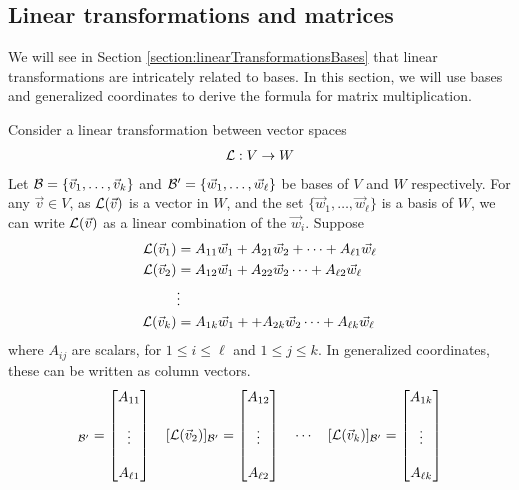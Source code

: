 \subsection{Linear transformations and matrices}
We will see in Section \ref{section:linearTransformationsBases} that linear transformations are intricately related to bases.
In this section, we will use bases and generalized coordinates to derive the formula for matrix multiplication.

Consider a linear transformation between vector spaces
\begin{align*}
  \mathcal{L}: V \rightarrow W
\end{align*}
Let $\mathcal{B} = \{ \vec{v}_1 , \dots, \vec{v}_k \}$ and $\mathcal{B}'= \{ \vec{w}_1 , \dots, \vec{w}_\ell \}$ be bases of $V$ and $W$ respectively.
For any $\vec{v} \in V$, as $\mathcal{L}(\vec{v})$ is a vector in $W$, and the set $\{ \vec{w}_1 , \dots, \vec{w}_\ell \}$ is a basis of $W$, we can write $\mathcal{L}(\vec{v})$ as a linear combination of the $\vec{w}_i$.
Suppose
\begin{align*}
  \mathcal{L} (\vec{v}_1) &= A_{11} \vec{w}_1 + A_{21} \vec{w}_2 + \dots + A_{\ell 1} \vec{w}_\ell\\
  \mathcal{L} (\vec{v}_2) &= A_{12} \vec{w}_1 + A_{22} \vec{w}_2  \dots + A_{\ell 2} \vec{w}_\ell \\
  & \vdots \\
  \mathcal{L} (\vec{v}_k) &= A_{1 k} \vec{w}_1 + + A_{2k} \vec{w}_2 \dots + A_{\ell k} \vec{w}_\ell
\end{align*}
where $A_{ij}$ are scalars, for $1 \le i \le \ell$ and $1 \le j \le k$.
In generalized coordinates, these can be written as column vectors.
\begin{align*}
  [\call (\vec{v}_1)]_{\calb'} = \begin{bmatrix} A_{11} \\\\ \vdots \\\\ A_{\ell 1} \end{bmatrix} \quad
  [\call (\vec{v}_2)]_{\calb'} = \begin{bmatrix} A_{12} \\\\ \vdots \\\\ A_{\ell 2} \end{bmatrix} \quad
  \cdots \quad
  [\call (\vec{v}_k)]_{\calb'} = \begin{bmatrix} A_{1k} \\\\ \vdots \\\\ A_{\ell k} \end{bmatrix}
\end{align*}

